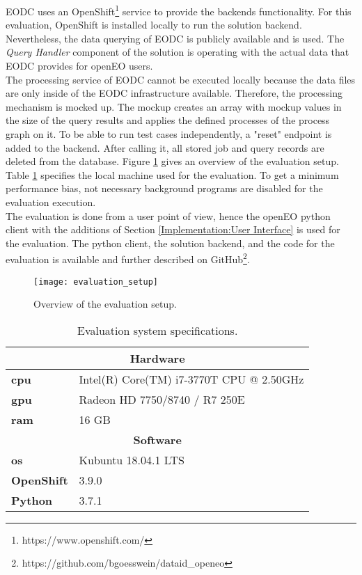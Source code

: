 \documentclass[draft,final]{vutinfth} %
\begin{document}
EODC uses an OpenShift\footnote{https://www.openshift.com/} service to provide the backends functionality. For this evaluation, OpenShift is installed locally to run the solution backend. Nevertheless, the data querying of EODC is publicly available and is used. The \textit{Query Handler} component of the solution is operating with the actual data that EODC provides for openEO users. \\
The processing service of EODC cannot be executed locally because the data files are only inside of the EODC infrastructure available. Therefore, the processing mechanism is mocked up. The mockup creates an array with mockup values in the size of the query results and applies the defined processes of the process graph on it. To be able to run test cases independently, a "reset" endpoint is added to the backend. After calling it, all stored job and query records are deleted from the database. Figure \ref{fig:evaluation_setup} gives an overview of the evaluation setup. \\
Table \ref{Tab:eva_hardware} specifies the local machine used for the evaluation. To get a minimum performance bias, not necessary background programs are disabled for the evaluation execution.\\  
The evaluation is done from a user point of view, hence the openEO python client with the additions of Section \ref{Implementation:User Interface} is used for the evaluation. The python client, the solution backend, and the code for the evaluation is available and further described on GitHub\footnote{https://github.com/bgoesswein/dataid\_openeo}. 

\begin{figure}[h]
	\centering
	\texttt{[image: evaluation\_setup]}
	\caption{Overview of the evaluation setup.}
	\label{fig:evaluation_setup} %
\end{figure}

\begin{table}[]
	\caption{Evaluation system specifications.}
	\centering
	\begin{tabular}{l|l}
		\multicolumn{2}{c}{\textbf{Hardware}} \\ \hline
		\textbf{\acrshort{cpu}} & Intel(R) Core(TM) i7-3770T CPU @ 2.50GHz \\ 
		\textbf{\acrshort{gpu}} & Radeon HD 7750/8740 / R7 250E  \\ 
		\textbf{\acrshort{ram}} & 16 GB  \\ 
		\multicolumn{2}{c}{\textbf{Software}} \\ \hline
		\textbf{\acrshort{os}} & Kubuntu 18.04.1 LTS \\ 
		\textbf{OpenShift} & 3.9.0  \\ 
		\textbf{Python} & 3.7.1  \\ 
	\end{tabular}
	\label{Tab:eva_hardware}
\end{table}
\end{document}
